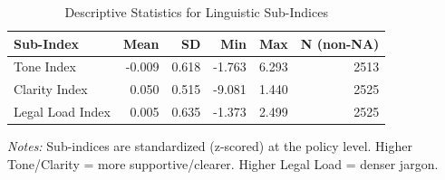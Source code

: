\begin{table}[H]
\centering
\caption{Descriptive Statistics for Linguistic Sub-Indices}
\label{tab:table8_subindices}
\begin{threeparttable}
\small
\begin{tabular}{lrrrrr}
\toprule
\textbf{Sub-Index} & \textbf{Mean} & \textbf{SD} & \textbf{Min} & \textbf{Max} & \textbf{N (non-NA)} \\
\midrule
Tone Index & -0.009 & 0.618 & -1.763 & 6.293 & 2513 \\
Clarity Index & 0.050 & 0.515 & -9.081 & 1.440 & 2525 \\
Legal Load Index & 0.005 & 0.635 & -1.373 & 2.499 & 2525 \\
\bottomrule
\end{tabular}
\begin{tablenotes}\small
\item \textit{Notes:} Sub-indices are standardized (z-scored) at the policy level. Higher Tone/Clarity = more supportive/clearer. Higher Legal Load = denser jargon.
\end{tablenotes}
\end{threeparttable}
\end{table}